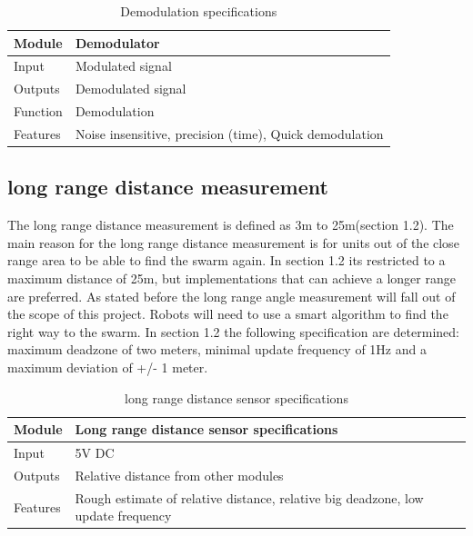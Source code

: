 \documentclass[10pt,a4paper]{article}
\begin{document}
\begin{table}[H]
\centering
\caption{Demodulation specifications}
\label{demosensor}
\begin{tabular}{|p{}|p{}|}
\hline
Module   & Demodulator                                   \\ \hline
Input    & Modulated signal                                             \\ \hline
Outputs  & Demodulated signal                                         \\ \hline
Function & Demodulation \\ \hline
Features & Noise insensitive, precision (time), Quick demodulation  \\ \hline
\end{tabular}
\end{table}


\subsection{long range distance measurement}
The long range distance measurement is defined as 3m to 25m(section 1.2). The main reason for the long range distance measurement is for units out of the close range area to be able to find the swarm again. In section 1.2 its restricted to a maximum distance of 25m, but implementations that can achieve a longer range are preferred. As stated before the long range angle measurement will fall out of the scope of this project. Robots will need to use a smart algorithm to find the right way to the swarm. In section 1.2 the following specification are determined: maximum deadzone of two meters, minimal update frequency of 1Hz and a maximum deviation of +/- 1 meter.

\begin{table}[H]
\centering
\caption{long range distance sensor specifications}
\label{longrangesensor}
\begin{tabular}{|p{}|p{}|}
\hline
Module   & Long range distance sensor specifications                          \\ \hline
Input    & 5V DC                                           \\ \hline
Outputs  & Relative distance from other modules                                        \\ \hline
Features & Rough estimate of relative distance, relative big deadzone, low update frequency  \\ \hline
\end{tabular}
\end{table}
\end{document}
